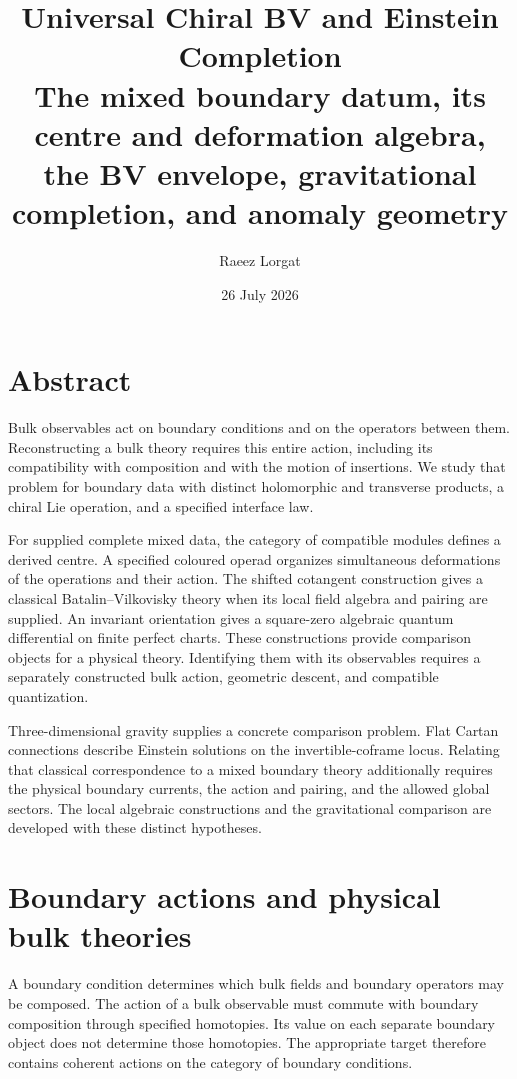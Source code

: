 \documentclass[11pt,twoside,openright]{memoir}
\title{\texorpdfstring{\textbf{Universal Chiral BV and Einstein Completion}\\[0.55em]\Large The mixed boundary datum, its centre and deformation algebra, the BV envelope, gravitational completion, and anomaly geometry}{Universal Chiral BV and Einstein Completion: The mixed boundary datum, its centre and deformation algebra, the BV envelope, gravitational completion, and anomaly geometry}}
\author{Raeez Lorgat}
\date{26 July 2026}
\begin{document}
\frontmatter
\maketitle
\thispagestyle{empty}
\cleardoublepage
\chapter*{Abstract}

Bulk observables act on boundary conditions and on the operators between them. Reconstructing a bulk theory requires this entire action, including its compatibility with composition and with the motion of insertions. We study that problem for boundary data with distinct holomorphic and transverse products, a chiral Lie operation, and a specified interface law.

For supplied complete mixed data, the category of compatible modules defines a derived centre. A specified coloured operad organizes simultaneous deformations of the operations and their action. The shifted cotangent construction gives a classical Batalin--Vilkovisky theory when its local field algebra and pairing are supplied. An invariant orientation gives a square-zero algebraic quantum differential on finite perfect charts. These constructions provide comparison objects for a physical theory. Identifying them with its observables requires a separately constructed bulk action, geometric descent, and compatible quantization.

Three-dimensional gravity supplies a concrete comparison problem. Flat Cartan connections describe Einstein solutions on the invertible-coframe locus. Relating that classical correspondence to a mixed boundary theory additionally requires the physical boundary currents, the action and pairing, and the allowed global sectors. The local algebraic constructions and the gravitational comparison are developed with these distinct hypotheses.

\chapter*{Boundary actions and physical bulk theories}
A boundary condition determines which bulk fields and boundary operators may be composed. The action of a bulk observable must commute with boundary composition through specified homotopies. Its value on each separate boundary object does not determine those homotopies. The appropriate target therefore contains coherent actions on the category of boundary conditions.
\end{document}
